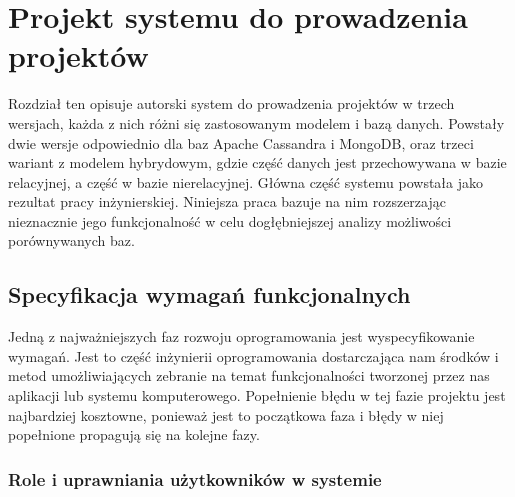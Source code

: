 \chapter{Projekt systemu do prowadzenia projektów}

Rozdział ten opisuje autorski system do prowadzenia projektów w trzech wersjach, każda z nich różni się zastosowanym modelem i bazą danych.
Powstały dwie wersje odpowiednio dla baz Apache Cassandra i MongoDB, oraz trzeci wariant z modelem hybrydowym, gdzie część danych jest przechowywana w bazie relacyjnej, a część w bazie nierelacyjnej.
Główna część systemu powstała jako rezultat pracy inżynierskiej.
Niniejsza praca bazuje na nim rozszerzając nieznacznie jego funkcjonalność w celu dogłębniejszej analizy możliwości porównywanych baz.

\section{Specyfikacja wymagań funkcjonalnych}

Jedną z najważniejszych faz rozwoju oprogramowania jest wyspecyfikowanie wymagań.
Jest to część inżynierii oprogramowania dostarczająca nam środków i metod umożliwiających zebranie na temat funkcjonalności tworzonej przez nas aplikacji lub systemu komputerowego.
Popełnienie błędu w tej fazie projektu jest najbardziej kosztowne, ponieważ jest to początkowa faza i błędy w niej popełnione propagują się na kolejne fazy.

\subsection{Role i uprawniania użytkowników w systemie}

